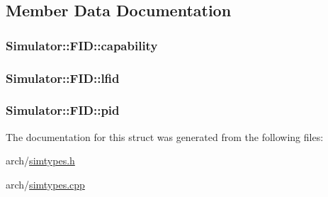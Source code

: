 \subsection{Member Data Documentation}
\hypertarget{struct_simulator_1_1_f_i_d_af7b2b91076281bd58b952e13236caeb0}{
\subsubsection[{capability}]{ Simulator\+::\+F\+I\+D\+::capability}}\label{struct_simulator_1_1_f_i_d_af7b2b91076281bd58b952e13236caeb0}
\hypertarget{struct_simulator_1_1_f_i_d_a21c50063b6de25afc79b9e50c3b8757a}{
\subsubsection[{lfid}]{ Simulator\+::\+F\+I\+D\+::lfid}}\label{struct_simulator_1_1_f_i_d_a21c50063b6de25afc79b9e50c3b8757a}
\hypertarget{struct_simulator_1_1_f_i_d_ab529d6fc0c2ae64c7b156eb481b0e05d}{
\subsubsection[{pid}]{ Simulator\+::\+F\+I\+D\+::pid}}\label{struct_simulator_1_1_f_i_d_ab529d6fc0c2ae64c7b156eb481b0e05d}


The documentation for this struct was generated from the following files\+:\begin{DoxyCompactItemize}
\item 
arch/\hyperlink{simtypes_8h}{simtypes.\+h}\item 
arch/\hyperlink{simtypes_8cpp}{simtypes.\+cpp}\end{DoxyCompactItemize}

